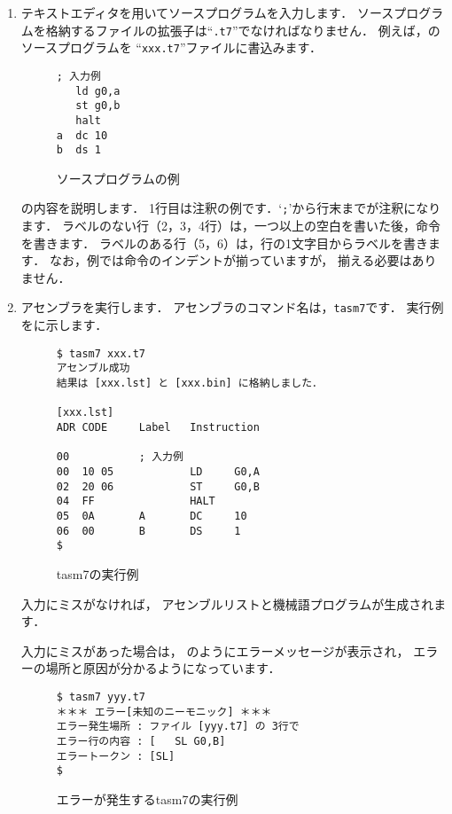 \begin{enumerate}
\item テキストエディタを用いてソースプログラムを入力します．
ソースプログラムを格納するファイルの拡張子は``{\tt .t7}''でなければなりません．
例えば，のソースプログラムを
``{\tt xxx.t7}''ファイルに書込みます．

\begin{figure}[bt]
{\small\begin{lstlisting}
; 入力例
   ld g0,a
   st g0,b
   halt
a  dc 10
b  ds 1
\end{lstlisting}}
\caption{ソースプログラムの例}
\label{fig:chap6:source}
\end{figure}

の内容を説明します．
1行目は注釈の例です．`{\tt ;}'から行末までが注釈になります．
ラベルのない行（2，3，4行）は，一つ以上の空白を書いた後，命令を書きます．
ラベルのある行（5，6）は，行の1文字目からラベルを書きます．
なお，例では命令のインデントが揃っていますが，
揃える必要はありません．

\item アセンブラを実行します．
アセンブラのコマンド名は，{\tt tasm7}です．
実行例をに示します．

\begin{figure}[bt]
{\small\begin{lstlisting}[numbers=none]
$ tasm7 xxx.t7
アセンブル成功
結果は [xxx.lst] と [xxx.bin] に格納しました．

[xxx.lst]
ADR CODE     Label   Instruction

00           ; 入力例
00  10 05            LD     G0,A
02  20 06            ST     G0,B
04  FF               HALT
05  0A       A       DC     10
06  00       B       DS     1
$
\end{lstlisting}}
\caption{tasm7の実行例}
\label{fig:chap6:tasm7}
\end{figure}

入力にミスがなければ，
アセンブルリストと機械語プログラムが生成されます．

入力にミスがあった場合は，
のようにエラーメッセージが表示され，
エラーの場所と原因が分かるようになっています．

\begin{figure}[bt]
{\small\begin{lstlisting}[numbers=none]
$ tasm7 yyy.t7
＊＊＊ エラー[未知のニーモニック] ＊＊＊
エラー発生場所 : ファイル [yyy.t7] の 3行で
エラー行の内容 : [   SL G0,B]
エラートークン : [SL]
$
\end{lstlisting}}
\caption{エラーが発生するtasm7の実行例}
\label{fig:chap6:error}
\end{figure}
\end{enumerate}

